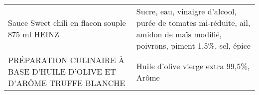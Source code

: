 \begin{longtable}{p{5cm}p{10cm}}
                                                          Sauce Sweet chili en flacon souple 875 ml HEINZ &                                                                                                                                                                                                                                                                                                                                                                                                                                                                                                                                                                                                                                                                                                                                                                                                                                                                                                               Sucre, eau, vinaigre d'alcool, purée de tomates mi-réduite, ail, amidon de maïs modifié, poivrons, piment 1,5\%, sel, épice \\
                                   PRÉPARATION CULINAIRE À BASE D'HUILE D'OLIVE ET D'ARÔME TRUFFE BLANCHE &                                                                                                                                                                                                                                                                                                                                                                                                                                                                                                                                                                                                                                                                                                                                                                                                                                                                                                                                                                                                  Huile d'olive vierge extra 99,5\%, Arôme \\

\end{longtable}
